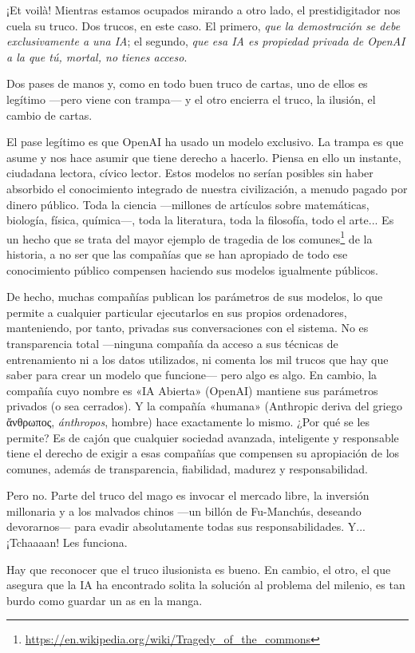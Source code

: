 \documentclass[11pt,a4paper]{article}
\begin{document}
¡Et voilà! Mientras estamos ocupados mirando a otro lado, el prestidigitador nos cuela su truco. Dos trucos, en este caso. El primero, \emph{que la demostración se debe exclusivamente a una IA}; el segundo, \emph{que esa IA es propiedad privada de OpenAI a la que tú, mortal, no tienes acceso}.

Dos pases de manos y, como en todo buen truco de cartas, uno de ellos es legítimo ---pero viene con trampa--- y el otro encierra el truco, la ilusión, el cambio de cartas.

El pase legítimo es que OpenAI ha usado un modelo exclusivo. La trampa es que asume y nos hace asumir que tiene derecho a hacerlo. Piensa en ello un instante, ciudadana lectora, cívico lector. Estos modelos no serían posibles sin haber absorbido el conocimiento integrado de nuestra civilización, a menudo pagado por dinero público. Toda la ciencia ---millones de artículos sobre matemáticas, biología, física, química---, toda la literatura, toda la filosofía, todo el arte... Es un hecho que se trata del mayor ejemplo de tragedia de los comunes\footnote{\url{https://en.wikipedia.org/wiki/Tragedy_of_the_commons}} de la historia, a no ser que las compañías que se han apropiado de todo ese conocimiento público compensen haciendo sus modelos igualmente públicos.

De hecho, muchas compañías publican los parámetros de sus modelos, lo que permite a cualquier particular ejecutarlos en sus propios ordenadores, manteniendo, por tanto, privadas sus conversaciones con el sistema. No es transparencia total ---ninguna compañía da acceso a sus técnicas de entrenamiento ni a los datos utilizados, ni comenta los mil trucos que hay que saber para crear un modelo que funcione--- pero algo es algo. En cambio, la compañía cuyo nombre es «IA Abierta» (OpenAI) mantiene sus parámetros privados (o sea cerrados). Y la compañía «humana» (Anthropic deriva del griego ἄνθρωπος, \emph{ánthropos}, hombre) hace exactamente lo mismo. ¿Por qué se les permite? Es de cajón que cualquier sociedad avanzada, inteligente y responsable tiene el derecho de exigir a esas compañías que compensen su apropiación de los comunes, además de transparencia, fiabilidad, madurez y responsabilidad.

Pero no. Parte del truco del mago es invocar el mercado libre, la inversión millonaria y a los malvados chinos ---un billón de Fu-Manchús, deseando devorarnos--- para evadir absolutamente todas sus responsabilidades. Y... ¡Tchaaaan! Les funciona.

Hay que reconocer que el truco ilusionista es bueno. En cambio, el otro, el que asegura que la IA ha encontrado solita la solución al problema del milenio, es tan burdo como guardar un as en la manga.
\end{document}
